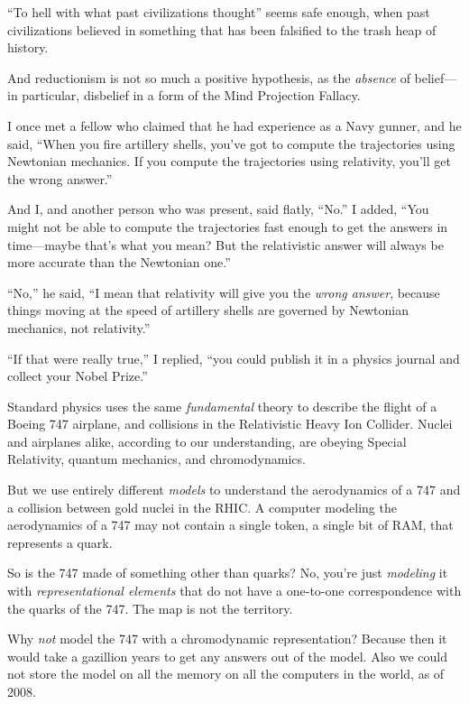 {
 ``To hell with what past civilizations
thought'' seems safe enough, when past civilizations
believed in something that has been falsified to the trash heap of
history.}

{
 And reductionism is not so much a positive hypothesis, as the
\textit{absence} of belief---in particular, disbelief in a form of the
Mind Projection Fallacy.}

{
 I once met a fellow who claimed that he had experience as a Navy
gunner, and he said, ``When you fire artillery shells,
you've got to compute the trajectories using Newtonian
mechanics. If you compute the trajectories using relativity,
you'll get the wrong answer.''}

{
 And I, and another person who was present, said flatly,
``No.'' I added,
``You might not be able to compute the trajectories
fast enough to get the answers in time---maybe that's
what you mean? But the relativistic answer will always be more accurate
than the Newtonian one.''}

{
 ``No,'' he said,
``I mean that relativity will give you the
\textit{wrong answer}, because things moving at the speed of artillery
shells are governed by Newtonian mechanics, not
relativity.''}

{
 ``If that were really true,'' I
replied, ``you could publish it in a physics journal
and collect your Nobel Prize.''}

{
 Standard physics uses the same \textit{fundamental} theory to
describe the flight of a Boeing 747 airplane, and collisions in the
Relativistic Heavy Ion Collider. Nuclei and airplanes alike, according
to our understanding, are obeying Special Relativity, quantum
mechanics, and chromodynamics.}

{
 But we use entirely different \textit{models} to understand the
aerodynamics of a 747 and a collision between gold nuclei in the RHIC.
A computer modeling the aerodynamics of a 747 may not contain a single
token, a single bit of RAM, that represents a quark.}

{
 So is the 747 made of something other than quarks? No,
you're just \textit{modeling} it with
\textit{representational elements} that do not have a one-to-one
correspondence with the quarks of the 747. The map is not the
territory.}

{
 Why \textit{not} model the 747 with a chromodynamic
representation? Because then it would take a gazillion years to get any
answers out of the model. Also we could not store the model on all the
memory on all the computers in the world, as of 2008.}

